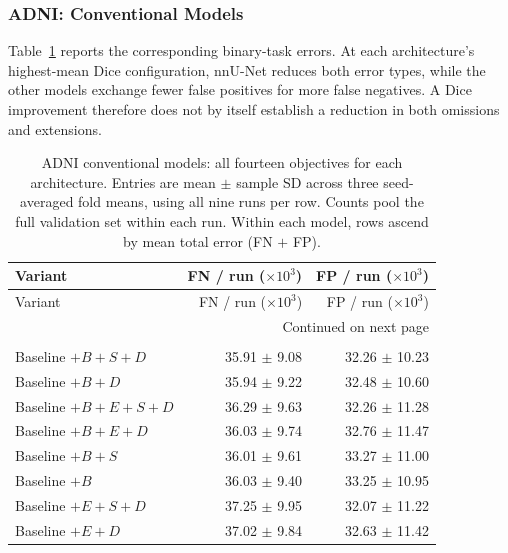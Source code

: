\subsubsection{ADNI: Conventional Models}

Table~\ref{tab:adni-all-errors} reports the corresponding binary-task
errors. At each architecture's highest-mean Dice configuration, nnU-Net
reduces both error types, while the other models exchange fewer false
positives for more false negatives. A Dice improvement therefore does
not by itself establish a reduction in both omissions and extensions.

\begingroup\footnotesize{}
\setlength{\tabcolsep}{4pt}
\renewcommand{\arraystretch}{1.12}
\begin{longtable}{@{}lrr@{}}
\caption{ADNI conventional models: all fourteen objectives for each architecture. Entries are mean $\pm$ sample SD across three seed-averaged fold means, using all nine runs per row. Counts pool the full validation set within each run. Within each model, rows ascend by mean total error (FN $+$ FP).}
\label{tab:adni-all-errors}\\
\hline
Variant & \shortstack{FN / run\\($\times 10^{3}$)} & \shortstack{FP / run\\($\times 10^{3}$)} \\ \hline
\endfirsthead
\hline
Variant & \shortstack{FN / run\\($\times 10^{3}$)} & \shortstack{FP / run\\($\times 10^{3}$)} \\ \hline
\endhead
\hline
\multicolumn{3}{r}{Continued on next page}\\
\endfoot
\hline\endlastfoot
\multicolumn{3}{@{}l}{\textbf{nnU-Net}}\\*
Baseline $+B+S+D$ & 35.91 $\pm$ 9.08 & 32.26 $\pm$ 10.23 \\
Baseline $+B+D$ & 35.94 $\pm$ 9.22 & 32.48 $\pm$ 10.60 \\
Baseline $+B+E+S+D$ & 36.29 $\pm$ 9.63 & 32.26 $\pm$ 11.28 \\
Baseline $+B+E+D$ & 36.03 $\pm$ 9.74 & 32.76 $\pm$ 11.47 \\
Baseline $+B+S$ & 36.01 $\pm$ 9.61 & 33.27 $\pm$ 11.00 \\
Baseline $+B$ & 36.03 $\pm$ 9.40 & 33.25 $\pm$ 10.95 \\
Baseline $+E+S+D$ & 37.25 $\pm$ 9.95 & 32.07 $\pm$ 11.22 \\
Baseline $+E+D$ & 37.02 $\pm$ 9.84 & 32.63 $\pm$ 11.42 \\

\end{longtable}
